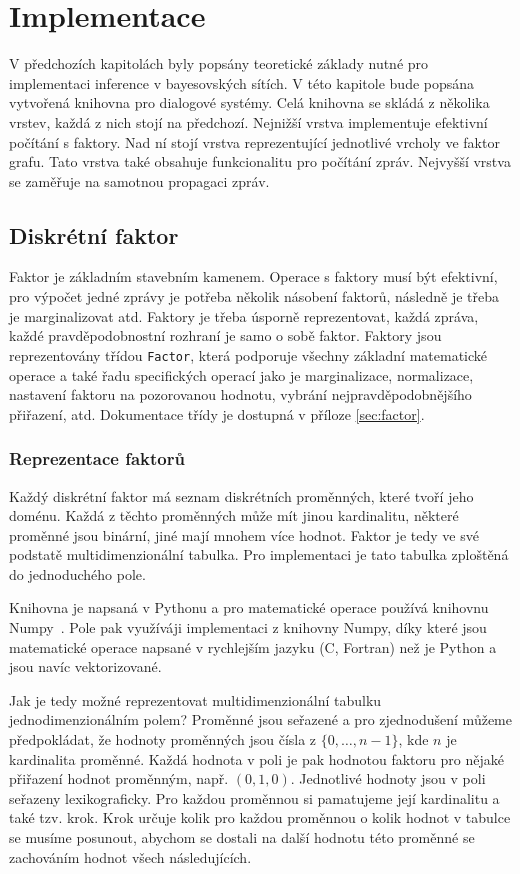 \chapter{Implementace}
V předchozích kapitolách byly popsány teoretické základy nutné pro implementaci inference v bayesovských sítích.
V této kapitole bude popsána vytvořená knihovna pro dialogové systémy.
Celá knihovna se skládá z několika vrstev, každá z nich stojí na předchozí.
Nejnižší vrstva implementuje efektivní počítání s faktory.
Nad ní stojí vrstva reprezentující jednotlivé vrcholy ve faktor grafu.
Tato vrstva také obsahuje funkcionalitu pro počítání zpráv.
Nejvyšší vrstva se zaměřuje na samotnou propagaci zpráv.

\section{Diskrétní faktor}

Faktor je základním stavebním kamenem.
Operace s faktory musí být efektivní, pro výpočet jedné zprávy je potřeba několik násobení faktorů, následně je třeba je marginalizovat atd.
Faktory je třeba úsporně reprezentovat, každá zpráva, každé pravděpodobnostní rozhraní je samo o sobě faktor.
Faktory jsou reprezentovány třídou \texttt{Factor}, která podporuje všechny základní matematické operace a také řadu specifických operací jako je marginalizace, normalizace, nastavení faktoru na pozorovanou hodnotu, vybrání nejpravděpodobnějšího přiřazení, atd.
Dokumentace třídy je dostupná v příloze \ref{sec:factor}. 

\subsection{Reprezentace faktorů}
\label{sec:repfak}

Každý diskrétní faktor má seznam diskrétních proměnných, které tvoří jeho doménu.
Každá z těchto proměnných může mít jinou kardinalitu, některé proměnné jsou binární, jiné mají mnohem více hodnot.
Faktor je tedy ve své podstatě multidimenzionální tabulka.
Pro implementaci je tato tabulka zploštěná do jednoduchého pole.

Knihovna je napsaná v Pythonu a pro matematické operace používá knihovnu Numpy~\cite{oliphant-2006-guide}.
Pole pak využíváji implementaci z knihovny Numpy, díky které jsou matematické operace napsané v rychlejším jazyku (C, Fortran) než je Python a jsou navíc vektorizované.

Jak je tedy možné reprezentovat multidimenzionální tabulku jednodimenzionálním polem?
Proměnné jsou seřazené a pro zjednodušení můžeme předpokládat, že hodnoty proměnných jsou čísla z $\{0, \dots, n-1\}$, kde $n$ je kardinalita proměnné.
Každá hodnota v poli je pak hodnotou faktoru pro nějaké přiřazení hodnot proměnným, např. $(0, 1, 0)$.
Jednotlivé hodnoty jsou v poli seřazeny lexikograficky.
Pro každou proměnnou si pamatujeme její kardinalitu a také tzv. krok.
Krok určuje kolik pro každou proměnnou o kolik hodnot v tabulce se musíme posunout, abychom se dostali na další hodnotu této proměnné se zachováním hodnot všech následujících.


